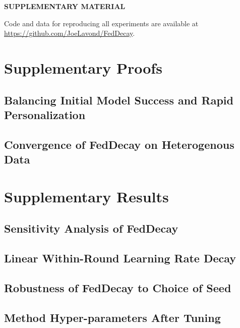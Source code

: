 \documentclass[12pt]{article}
\begin{document}
    \label{supplementary-material}
    \bigskip
    \begin{center}
    {\large\bf SUPPLEMENTARY MATERIAL}
    \end{center}

    Code and data for reproducing all experiments are available at
    \url{https://github.com/JoeLavond/FedDecay}.

    
    \appendix

    \section{Supplementary Proofs}

        \subsection{Balancing Initial Model Success and Rapid Personalization}
        \label{pf: decay-pf-taylor}
        

        \subsection{Convergence of FedDecay on Heterogenous Data}
        \label{pf: decay-pf-conv}
        

    \section{Supplementary Results}

        \subsection{Sensitivity Analysis of FedDecay}
        \label{app: decay-app-sens}
        

        \subsection{Linear Within-Round Learning Rate Decay}
        \label{app: decay-app-scheme}
        

        \subsection{Robustness of FedDecay to Choice of Seed}
        \label{app: decay-app-seed}
        

        \subsection{Method Hyper-parameters After Tuning}
        \label{app: decay-app-params}
        
\end{document}
